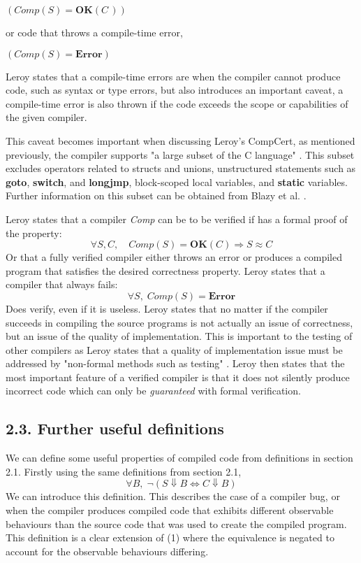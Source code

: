 \documentclass[11pt, a4paper, twoside, openright, twocolumn]{report}
\begin{document}
$(\textit{Comp}(S) = \textbf{OK}(\textit{C}\,))$

or code that throws a compile-time error,

$(\textit{Comp}(S) = \textbf{Error})$

Leroy states that a compile-time errors are when the compiler cannot produce code, such as syntax or type errors, but also introduces an important
caveat, a compile-time error is also thrown if the code exceeds the scope or capabilities of the given compiler. 

This caveat becomes important when discussing 
Leroy's CompCert, as mentioned previously, the compiler supports "a large subset of the C language" \cite{Leroy:2009}. This subset excludes operators related to structs and
unions, unstructured statements such as \textbf{goto}, \textbf{switch}, and \textbf{longjmp}, block-scoped local variables, and \textbf{static} variables.
Further information on this subset can be obtained from  Blazy et al. \cite{Blazy:2006}.

Leroy states that a compiler \textit{Comp} can be to be verified if has a formal proof of the property:
\begin{equation}
\forall S,C, \quad Comp(S) = \textbf{OK}(C) \Longrightarrow S \approx C
\end{equation}
Or that a fully verified compiler either throws an error or produces a compiled program that satisfies the desired correctness property.
Leroy states that a compiler that always fails:
\begin{equation}
\forall S, \; Comp(S) = \textbf{Error}
\end{equation}
Does verify, even if it is useless. Leroy states that no matter if the compiler succeeds in compiling the source programs is not actually an issue of correctness,
but an issue of the quality of implementation. This is important to the testing of other compilers as Leroy states \cite{Leroy:2009} that a quality of implementation issue must
be addressed by "non-formal methods such as testing" \cite{Leroy:2009}. Leroy then states that the most important feature of a verified compiler is that it
does not silently produce incorrect code which can only be \textit{guaranteed} with formal verification.

\subsection*{2.3. Further useful definitions}
We can define some useful properties of compiled code from definitions in section 2.1. 
Firstly using the same definitions from section 2.1,
\begin{equation}
\forall B, \; \neg  (S \Downarrow B \Longleftrightarrow C \Downarrow B)
\end{equation}
We can introduce this definition. This describes the case of a compiler bug, or when the compiler produces compiled code that exhibits different observable
behaviours than the source code that was used to create the compiled program. This definition is a clear extension of (1) where the equivalence is negated to 
account for the observable behaviours differing.
\end{document}

